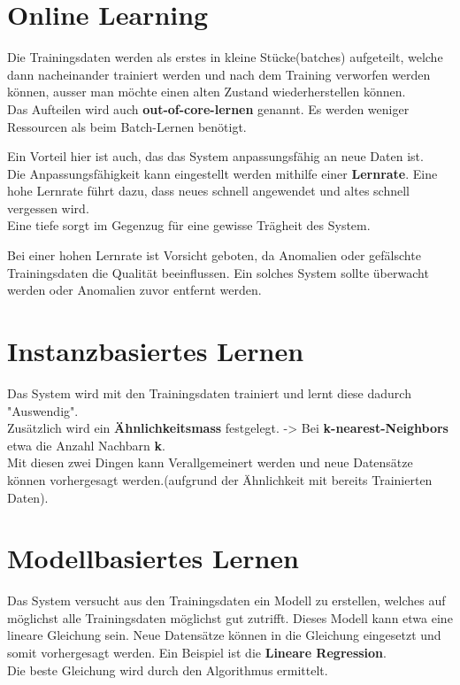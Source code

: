 \documentclass[11pt]{article}
\begin{document}
\section{Online Learning}\label{online-learning}

Die Trainingsdaten werden als erstes in kleine Stücke(batches)
aufgeteilt, welche dann nacheinander trainiert werden und nach dem
Training verworfen werden können, ausser man möchte einen alten Zustand
wiederherstellen können.\\
Das Aufteilen wird auch \textbf{out-of-core-lernen} genannt. Es werden
weniger Ressourcen als beim Batch-Lernen benötigt.

Ein Vorteil hier ist auch, das das System anpassungsfähig an neue Daten
ist.\\
Die Anpassungsfähigkeit kann eingestellt werden mithilfe einer
\textbf{Lernrate}. Eine hohe Lernrate führt dazu, dass neues schnell
angewendet und altes schnell vergessen wird.\\
Eine tiefe sorgt im Gegenzug für eine gewisse Trägheit des System.

Bei einer hohen Lernrate ist Vorsicht geboten, da Anomalien oder
gefälschte Trainingsdaten die Qualität beeinflussen. Ein solches System
sollte überwacht werden oder Anomalien zuvor entfernt werden.

    \section{Instanzbasiertes Lernen}\label{instanzbasiertes-lernen}

Das System wird mit den Trainingsdaten trainiert und lernt diese dadurch
"Auswendig".\\
Zusätzlich wird ein \textbf{Ähnlichkeitsmass} festgelegt.
-\textgreater{} Bei \textbf{k-nearest-Neighbors} etwa die Anzahl
Nachbarn \textbf{k}.\\
Mit diesen zwei Dingen kann Verallgemeinert werden und neue Datensätze
können vorhergesagt werden.(aufgrund der Ähnlichkeit mit bereits
Trainierten Daten).

\section{Modellbasiertes Lernen}\label{modellbasiertes-lernen}

Das System versucht aus den Trainingsdaten ein Modell zu erstellen,
welches auf möglichst alle Trainingsdaten möglichst gut zutrifft. Dieses
Modell kann etwa eine lineare Gleichung sein. Neue Datensätze können in
die Gleichung eingesetzt und somit vorhergesagt werden. Ein Beispiel ist
die \textbf{Lineare Regression}.\\
Die beste Gleichung wird durch den Algorithmus ermittelt.
\end{document}
